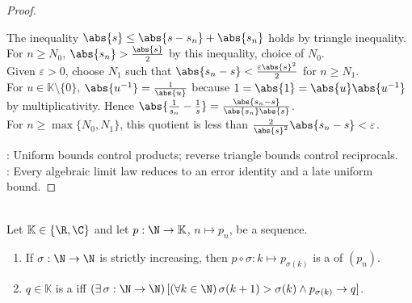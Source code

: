 \begin{theorem}
\begin{proof}
\begin{enumerate}[label=(\roman*)]
The inequality $\abs{s}\leq\abs{s-s_n}+\abs{s_n}$ holds by triangle inequality. For $n\geq N_0$, $\abs{s_n}>\frac{\abs{s}}{2}$ by this inequality, choice of $N_0$.\\
Given $\varepsilon>0$, choose $N_1$ such that $\abs{s_n-s}<\frac{\varepsilon\abs{s}^2}{2}$ for $n\geq N_1$.\\
For $u\in\mathbb{K}\setminus\{0\}$, $\abs{u^{-1}}=\frac{1}{\abs{u}}$ because $1=\abs{1}=\abs{u}\abs{u^{-1}}$ by multiplicativity. Hence $\abs{\frac{1}{s_n}-\frac{1}{s}}=\frac{\abs{s_n-s}}{\abs{s_n}\abs{s}}$.\\
For $n\geq\max\{N_0,N_1\}$, this quotient is less than $\frac{2}{\abs{s}^2}\abs{s_n-s}<\varepsilon$.
\end{enumerate}
: Uniform bounds control products; reverse triangle bounds control reciprocals.\\
: Every algebraic limit law reduces to an error identity and a late uniform bound.
\end{proof}
\end{theorem}

\begin{definition} \label{def:subsequence-and-subsequential-limit} \\
Let $\mathbb{K}\in\{\R,\C\}$ and let $p:\N\to\mathbb{K}$, $n\mapsto p_n$, be a sequence.
\begin{enumerate}[label=(\roman*)]
\setlength{\itemsep}{0pt}
\item If $\sigma:\N\to\N$ is strictly increasing, then $p\circ\sigma:k\mapsto p_{\sigma(k)}$ is a  of $(p_n)$.
\item $q\in\mathbb{K}$ is a  iff $(\exists\,\sigma:\N\to\N)\,[(\forall k\in\N)\,\sigma(k+1)>\sigma(k)\land p_{\sigma(k)}\to q]$.
\end{enumerate}
\end{definition}

